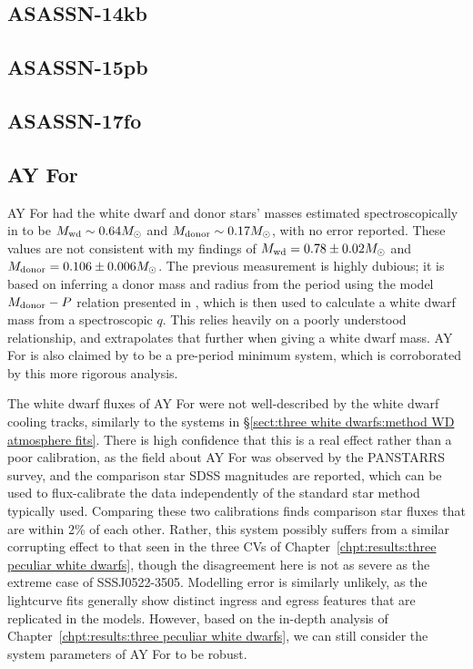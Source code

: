 \subsection{ASASSN-14kb}



\subsection{ASASSN-15pb}


\subsection{ASASSN-17fo}


\subsection{AY For}

AY For had the white dwarf and donor stars' masses estimated spectroscopically in \citet{mason2005} to be $M_{\rm wd} \sim 0.64 M_\odot$ and $M_{\rm donor} \sim 0.17 M_\odot$, with no error reported.
These values are not consistent with my findings of $M_{\rm wd} = 0.78\pm0.02 M_\odot$ and $M_{\rm donor} = 0.106\pm0.006 M_\odot$.
The previous measurement is highly dubious; it is based on inferring a donor mass and radius from the period using the model $M_{\rm donor} - P$ relation presented in \citet{howell2002}, which is then used to calculate a white dwarf mass from a spectroscopic $q$. This relies heavily on a poorly understood relationship, and extrapolates that further when giving a white dwarf mass.
AY For is also claimed by \citet{mason2005} to be a pre-period minimum system, which is corroborated by this more rigorous analysis.

The white dwarf fluxes of AY For were not well-described by the white dwarf cooling tracks, similarly to the systems in \S\ref{sect:three white dwarfs:method WD atmosphere fits}. There is high confidence that this is a real effect rather than a poor calibration, as the field about AY For was observed by the PANSTARRS survey, and the comparison star SDSS magnitudes are reported, which can be used to flux-calibrate the data independently of the standard star method typically used. Comparing these two calibrations finds comparison star fluxes that are within 2\% of each other. Rather, this system possibly suffers from a similar corrupting effect to that seen in the three CVs of Chapter~\ref{chpt:results:three peculiar white dwarfs}, though the disagreement here is not as severe as the extreme case of SSSJ0522-3505. Modelling error is similarly unlikely, as the lightcurve fits generally show distinct ingress and egress features that are replicated in the models. However, based on the in-depth analysis of Chapter~\ref{chpt:results:three peculiar white dwarfs}, we can still consider the system parameters of AY For to be robust.


